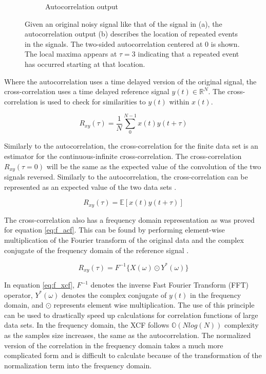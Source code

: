 \begin{figure} [h]
\begin{subfigure}[c]{0.49\textwidth}
                    \caption{Autocorrelation output}
                    \label{fig:autocorr out}
                \end{subfigure}
                \hfill
                \caption{Given an original noisy signal like that of the signal in (a), the autocorrelation output (b) describes the location of repeated events in the signals. The two-sided autocorrelation centered at 0 is shown. The local maxima appears at $\tau = 3$ indicating that a repeated event has occurred starting at that location.}
                \label{fig:example autocorr}
            \end{figure} 
            
            Where the autocorrelation uses a time delayed version of the original signal, the cross-correlation uses a time delayed reference signal $y(t) \in \mathbb{R}^N$. The cross-correlation is used to check for similarities to $y(t)$ within $x(t)$.
            
            \begin{equation} \label{eq:XCF}
                {R}_{xy}(\tau) = \frac{1}{N} \sum_{0}^{N-1} x(t)y(t+\tau)
            \end{equation}
            
            Similarly to the autocorrelation, the cross-correlation for the finite data set is an estimator for the continuous-infinite cross-correlation. The cross-correlation ${R}_{xy}(\tau=0)$ will be the same as the expected value of the convolution of the two signals reversed. Similarly to the autocorrelation, the cross-correlation can be represented as an expected value of the two data sets \cite{smith_mathematics_2007}. 
            
            \[
                R_{xy}(\tau) = \mathbb{E}[x(t)y(t+\tau)]
            \]
            
            The cross-correlation also has a frequency domain representation as was proved for equation \ref{eq:f_acf}. This can be found by performing element-wise multiplication of the Fourier transform of the original data and the complex conjugate of the frequency domain of the reference signal \cite{hamilton_time_1994}\cite{harris_use_1978}. 

            \begin{equation} \label{eq:f_xcf}
                {R}_{xy}(\tau) = F^{-1}\{X(\omega) \odot Y^*(\omega)\}
            \end{equation}

            In equation \ref*{eq:f_xcf}, $F^{-1}$ denotes the inverse Fast Fourier Transform (FFT) operator, $Y^*(\omega)$ denotes the complex conjugate of $y(t)$ in the frequency domain, and $\odot$ represents element wise multiplication. The use of this principle can be used to drastically speed up calculations for correlation functions of large data sets. In the frequency domain, the XCF follows $\mathbb{O}(Nlog(N))$ complexity as the samples size increases, the same as the autocorrelation. The normalized version of the correlation in the frequency domain takes a much more complicated form and is difficult to calculate because of the transformation of the normalization term into the frequency domain. 

